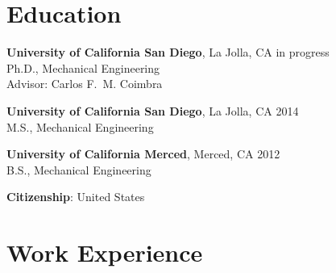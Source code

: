 \documentclass[10pt]{res}
\begin{document}
\address{University of California San Diego \\ 9500 Gilman Drive \#0411 \\ La Jolla, CA 92093--0411}
\address{%
    \hfill \href{mailto:dplarson@ucsd.edu}{dplarson@ucsd.edu} \\
    \hfill \url{http://ieng6.ucsd.edu/~dplarson} \\
    \hfill \url{http://github.com/dplarson}
}


\begin{resume}


\section{Education}
\vspace{0.1in}

\textbf{University of California San Diego}, La Jolla, CA \hfill in progress \\
Ph.D., Mechanical Engineering \\
Advisor: Carlos F.~M. Coimbra \\

\vspace{-0.2in}

\textbf{University of California San Diego}, La Jolla, CA \hfill 2014 \\
M.S., Mechanical Engineering \\

\vspace{-0.2in}

\textbf{University of California Merced}, Merced, CA \hfill 2012 \\
B.S., Mechanical Engineering


\hspace{-0.55in} \textbf{Citizenship}: United States


%
\section{Work Experience}
\vspace{0.1in}


\end{resume}
\end{document}
